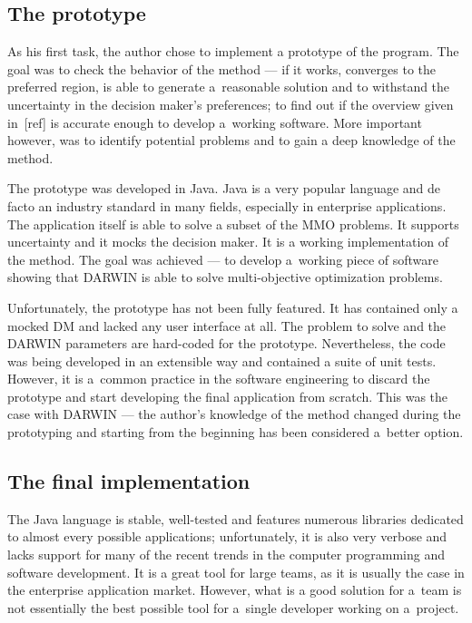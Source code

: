 \subsection{The prototype}

As his first task, the author chose to implement a prototype of the
program. The goal was to check the behavior of the method --- if it works,
converges to the preferred region, is able to generate a~reasonable solution
and to withstand the uncertainty in the decision maker's preferences; to find
out if the overview given in~[ref] is accurate enough to develop a~working
software. More important however, was to identify potential problems and to
gain a deep knowledge of the method.

The prototype was developed in Java. Java is a very popular language and de
facto an industry standard in many fields, especially in enterprise
applications. The application itself is able to solve a subset of the MMO
problems. It supports uncertainty and it mocks the decision maker. It is a
working implementation of the method. The goal was achieved --- to develop
a~working piece of software showing that DARWIN is able to solve
multi-objective optimization problems. 

Unfortunately, the prototype has not been fully featured. It has contained
only a mocked DM and lacked any user interface at all. The problem to solve
and the DARWIN parameters are hard-coded for the prototype. Nevertheless, the
code was being developed in an extensible way and contained a suite of unit
tests. However, it is a~common practice in the software engineering to discard
the prototype and start developing the final application from scratch.  This
was the case with DARWIN --- the author's knowledge of the method changed
during the prototyping and starting from the beginning has been considered
a~better option.

\subsection{The final implementation}
The Java language is stable, well-tested and features numerous libraries
dedicated to almost every possible applications; unfortunately, it is also
very verbose and lacks support for many of the recent trends in the computer
programming and software development. It is a great tool for large teams, as
it is usually the case in the enterprise application market. However, what is
a good solution for a~team is not essentially the best possible tool for
a~single developer working on a~project.

